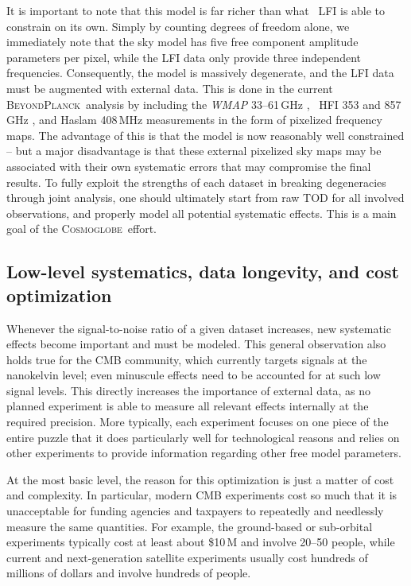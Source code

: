 \documentclass[twocolumn]{openjournal}
\newcommand{\BP}{\textsc{BeyondPlanck}}
\newcommand{\cosmoglobe}{\textsc{Cosmoglobe}}
\begin{document}
It is important to note that this model is far richer than what \Planck\ LFI is
able to constrain on its own. Simply by counting degrees of freedom alone, we
immediately note that the sky model has five free component amplitude
parameters per pixel, while the LFI data only provide three independent
frequencies. Consequently, the model is massively degenerate, and the LFI data
must be augmented with external data. This is done in the current \BP\ analysis
by including the \textit{WMAP} 33--61\,GHz \citep{bennett2012}, \Planck\ HFI
353 and 857\,GHz \citep{planck2016-l03}, and Haslam 408\,MHz \citep{haslam1982}
measurements in the form of pixelized frequency maps. The advantage of this is
that the model is now reasonably well constrained -- but a major disadvantage
is that these external pixelized sky maps may be associated with their own
systematic errors that may compromise the final results. To fully exploit the
strengths of each dataset in breaking degeneracies through joint analysis, one
should ultimately start from raw TOD for all involved observations, and
properly model all potential systematic effects. This is a main goal of the
\cosmoglobe\ effort.

\subsection{Low-level systematics, data longevity,
  and cost optimization}

Whenever the signal-to-noise ratio of a given dataset increases, new systematic
effects become important and must be modeled. This general observation also
holds true for the CMB community, which currently targets signals at the
nanokelvin level; even minuscule effects need to be accounted for at such low
signal levels. This directly increases the importance of external data, as no
planned experiment is able to measure all relevant effects internally at the
required precision. More typically, each experiment focuses on one piece of the
entire puzzle that it does particularly well for technological reasons and
relies on other experiments to provide information regarding other free model
parameters.

At the most basic level, the reason for this optimization is just a matter of
cost and complexity. In particular, modern CMB experiments cost so much that it
is unacceptable for funding agencies and taxpayers to repeatedly and needlessly
measure the same quantities. For example, the ground-based or sub-orbital
experiments typically cost at least about \$10\,M and involve 20--50 people,
while current and next-generation satellite experiments usually cost hundreds
of millions of dollars and involve hundreds of people.
\end{document}
